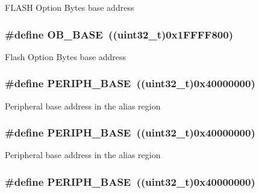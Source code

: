 F\-L\-A\-S\-H Option Bytes base address \hypertarget{group___peripheral__memory__map_gab5b5fb155f9ee15dfb6d757da1adc926}{
\subsubsection[{O\-B\-\_\-\-B\-A\-S\-E}]{\setlength{\rightskip}{0pt plus 5cm}\#define O\-B\-\_\-\-B\-A\-S\-E~((uint32\-\_\-t)0x1\-F\-F\-F\-F800)}}\label{group___peripheral__memory__map_gab5b5fb155f9ee15dfb6d757da1adc926}
Flash Option Bytes base address \hypertarget{group___peripheral__memory__map_ga9171f49478fa86d932f89e78e73b88b0}{
\subsubsection[{P\-E\-R\-I\-P\-H\-\_\-\-B\-A\-S\-E}]{\setlength{\rightskip}{0pt plus 5cm}\#define P\-E\-R\-I\-P\-H\-\_\-\-B\-A\-S\-E~((uint32\-\_\-t)0x40000000)}}\label{group___peripheral__memory__map_ga9171f49478fa86d932f89e78e73b88b0}
Peripheral base address in the alias region \hypertarget{group___peripheral__memory__map_ga9171f49478fa86d932f89e78e73b88b0}{
\subsubsection[{P\-E\-R\-I\-P\-H\-\_\-\-B\-A\-S\-E}]{\setlength{\rightskip}{0pt plus 5cm}\#define P\-E\-R\-I\-P\-H\-\_\-\-B\-A\-S\-E~((uint32\-\_\-t)0x40000000)}}\label{group___peripheral__memory__map_ga9171f49478fa86d932f89e78e73b88b0}
Peripheral base address in the alias region \hypertarget{group___peripheral__memory__map_ga9171f49478fa86d932f89e78e73b88b0}{
\subsubsection[{P\-E\-R\-I\-P\-H\-\_\-\-B\-A\-S\-E}]{\setlength{\rightskip}{0pt plus 5cm}\#define P\-E\-R\-I\-P\-H\-\_\-\-B\-A\-S\-E~((uint32\-\_\-t)0x40000000)}}\label{group___peripheral__memory__map_ga9171f49478fa86d932f89e78e73b88b0}
